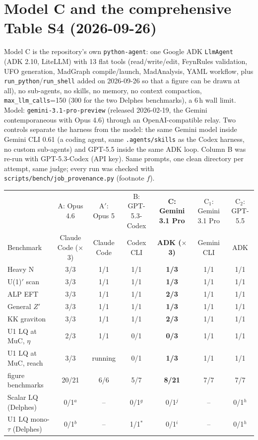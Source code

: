 \documentclass[11pt]{article}
\begin{document}
\section{Model C and the comprehensive Table S4 (2026-09-26)}
Model C is the repository's own \texttt{python-agent}: one Google ADK \texttt{LlmAgent} (ADK 2.10, LiteLLM) with 13 flat
tools (read/write/edit, FeynRules validation, UFO generation, MadGraph compile/launch, MadAnalysis, YAML workflow,
plus \texttt{run\_python}/\texttt{run\_shell} added on 2026-09-26 so that a figure can be drawn at all), no sub-agents,
no skills, no memory, no context compaction, \texttt{max\_llm\_calls}=150 (300 for the two Delphes benchmarks), a 6\,h
wall limit. Model: \texttt{gemini-3.1-pro-preview} (released 2026-02-19, the Gemini contemporaneous with Opus 4.6) through
an OpenAI-compatible relay. Two controls separate the harness from the model: the same Gemini model inside Gemini CLI 0.61
(a coding agent, same \texttt{.agents/skills} as the Codex harness, no custom sub-agents) and GPT-5.5 inside the same ADK
loop. Column B was re-run with GPT-5.3-Codex (API key). Same prompts, one clean directory per attempt, same judge; every run
was checked with \texttt{scripts/bench/job\_provenance.py} (footnote $f$).

\begin{center}\scriptsize\setlength{\tabcolsep}{3pt}
\begin{tabular}{lccc|c|cc}
\toprule
 & A: Opus 4.6 & A$'$: Opus 5 & B: GPT-5.3-Codex & \textbf{C: Gemini 3.1 Pro} & C$_1$: Gemini 3.1 Pro & C$_2$: GPT-5.5 \\
Benchmark & Claude Code ($\times$3) & Claude Code & Codex CLI & \textbf{ADK ($\times$3)} & Gemini CLI & ADK \\
\midrule
Heavy N & 3/3 & 1/1 & 1/1 & \textbf{1/3} & 1/1 & 1/1 \\
U(1)$'$ scan & 3/3 & 1/1 & 1/1 & \textbf{1/3} & 1/1 & 1/1 \\
ALP EFT & 3/3 & 1/1 & 1/1 & \textbf{2/3} & 1/1 & 1/1 \\
General $Z'$ & 3/3 & 1/1 & 1/1 & \textbf{1/3} & 1/1 & 1/1 \\
KK graviton & 3/3 & 1/1 & 1/1 & \textbf{2/3} & 1/1 & 1/1 \\
U1 LQ at MuC, $\eta$ & 2/3 & 1/1 & 0/1 & \textbf{0/3} & 1/1 & 1/1 \\
U1 LQ at MuC, reach & 3/3 & running & 0/1 & \textbf{1/3} & 1/1 & 1/1 \\
\midrule
figure benchmarks & 20/21 & 6/6 & 5/7 & \textbf{8/21} & 7/7 & 7/7 \\
\midrule
Scalar LQ (Delphes) & 0/1$^{a}$ & -- & 0/1$^{g}$ & 0/1$^{j}$ & -- & 0/1$^{h}$ \\
U1 LQ mono-$\tau$ (Delphes) & 0/1$^{b}$ & -- & 1/1$^{*}$ & 0/1$^{i}$ & -- & 0/1$^{h}$ \\
\bottomrule
\end{tabular}
\end{center}
\end{document}
